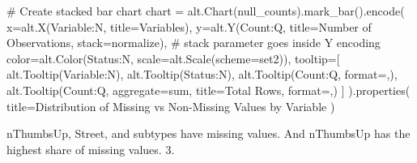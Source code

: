 \documentclass[
  letterpaper,
  DIV=11,
  numbers=noendperiod]{scrartcl}
\newenvironment{Shaded}{\begin{snugshade}}{\end{snugshade}}
\newcommand{\BuiltInTok}[1]{\textcolor[rgb]{0.00,0.23,0.31}{#1}}
\newcommand{\CommentTok}[1]{\textcolor[rgb]{0.37,0.37,0.37}{#1}}
\newcommand{\NormalTok}[1]{\textcolor[rgb]{0.00,0.23,0.31}{#1}}
\newcommand{\OperatorTok}[1]{\textcolor[rgb]{0.37,0.37,0.37}{#1}}
\newcommand{\StringTok}[1]{\textcolor[rgb]{0.13,0.47,0.30}{#1}}
\begin{document}
\begin{Shaded}
\begin{Highlighting}[]
\CommentTok{\# Create stacked bar chart}
\NormalTok{chart }\OperatorTok{=}\NormalTok{ alt.Chart(null\_counts).mark\_bar().encode(}
\NormalTok{    x}\OperatorTok{=}\NormalTok{alt.X(}\StringTok{\textquotesingle{}Variable:N\textquotesingle{}}\NormalTok{, title}\OperatorTok{=}\StringTok{\textquotesingle{}Variables\textquotesingle{}}\NormalTok{),}
\NormalTok{    y}\OperatorTok{=}\NormalTok{alt.Y(}\StringTok{\textquotesingle{}Count:Q\textquotesingle{}}\NormalTok{, }
\NormalTok{            title}\OperatorTok{=}\StringTok{\textquotesingle{}Number of Observations\textquotesingle{}}\NormalTok{,}
\NormalTok{            stack}\OperatorTok{=}\StringTok{\textquotesingle{}normalize\textquotesingle{}}\NormalTok{),  }\CommentTok{\# stack parameter goes inside Y encoding}
\NormalTok{    color}\OperatorTok{=}\NormalTok{alt.Color(}\StringTok{\textquotesingle{}Status:N\textquotesingle{}}\NormalTok{, scale}\OperatorTok{=}\NormalTok{alt.Scale(scheme}\OperatorTok{=}\StringTok{\textquotesingle{}set2\textquotesingle{}}\NormalTok{)),}
\NormalTok{    tooltip}\OperatorTok{=}\NormalTok{[}
\NormalTok{        alt.Tooltip(}\StringTok{\textquotesingle{}Variable:N\textquotesingle{}}\NormalTok{),}
\NormalTok{        alt.Tooltip(}\StringTok{\textquotesingle{}Status:N\textquotesingle{}}\NormalTok{),}
\NormalTok{        alt.Tooltip(}\StringTok{\textquotesingle{}Count:Q\textquotesingle{}}\NormalTok{, }\BuiltInTok{format}\OperatorTok{=}\StringTok{\textquotesingle{},\textquotesingle{}}\NormalTok{),}
\NormalTok{        alt.Tooltip(}\StringTok{\textquotesingle{}Count:Q\textquotesingle{}}\NormalTok{, aggregate}\OperatorTok{=}\StringTok{\textquotesingle{}sum\textquotesingle{}}\NormalTok{, title}\OperatorTok{=}\StringTok{\textquotesingle{}Total Rows\textquotesingle{}}\NormalTok{, }\BuiltInTok{format}\OperatorTok{=}\StringTok{\textquotesingle{},\textquotesingle{}}\NormalTok{)}
\NormalTok{    ]}
\NormalTok{).properties(}
\NormalTok{    title}\OperatorTok{=}\StringTok{\textquotesingle{}Distribution of Missing vs Non{-}Missing Values by Variable\textquotesingle{}}
\NormalTok{)}
\end{Highlighting}
\end{Shaded}

nThumbsUp, Street, and subtypes have missing values. And nThumbsUp has
the highest share of missing values. 3.
\end{document}
